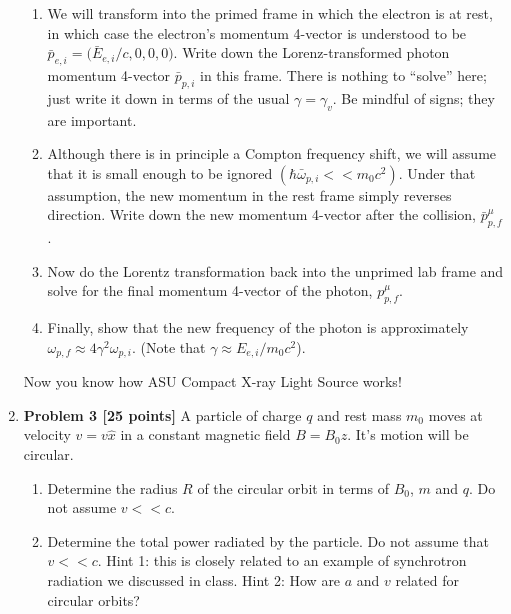 \documentclass[fleqn]{article}
\begin{document}
\begin{enumerate}
\begin{enumerate}
      \item We will transform into the primed frame in which the electron is at rest, in which case the
      electron’s momentum 4-vector is understood to be $\bar{p}_{e,i}=\bigg( \bar{E}_{e,i}/c, 0,0,0 \bigg)$.
      Write down the Lorenz-transformed photon momentum 4-vector $\bar{p}_{p,i}$ in this frame. There is 
      nothing to “solve” here; just write it down in terms of the usual $\gamma =\gamma_v$. Be mindful of 
      signs; they are important.

      \item Although there is in principle a Compton frequency shift, we will assume that it is small enough
      to be ignored $(\hbar \bar{\omega}_{p,i} << m_0 c^2)$. Under that assumption, the new momentum in the rest frame
      simply reverses direction. Write down the new momentum 4-vector after the collision, $\bar{p}^{\mu}_{p,f}$.


      \item Now do the Lorentz transformation back into the unprimed lab frame and solve for the final
      momentum 4-vector of the photon, $p^{\mu}_{p,f}$.

      \item Finally, show that the new frequency of the photon is approximately $\omega_{p,f} \approx 4 \gamma^2 \omega_{p,i}$.
      (Note that $\gamma \approx E_{e,i}/m_0 c^2$).

    \end{enumerate}
    Now you know how ASU Compact X-ray Light Source works!
    
    \pagebreak




    \item \textbf{Problem 3 [25 points]}
    A particle of charge $q$ and rest mass $m_0$ moves at velocity $v=v \hat{x}$ in a constant magnetic field
    $B=B_0 \hat{z}$. It’s motion will be circular.
    \begin{enumerate}
      \item Determine the radius $R$ of the circular orbit in terms of $B_0$, $m$ and $q$. Do not assume $v << c$.

      \item Determine the total power radiated by the particle. Do not assume that $v << c$. Hint 1: this is
      closely related to an example of synchrotron radiation we discussed in class. Hint 2: How are
      $a$ and $v$ related for circular orbits?

    \end{enumerate}
    

\end{enumerate}
\end{document}
